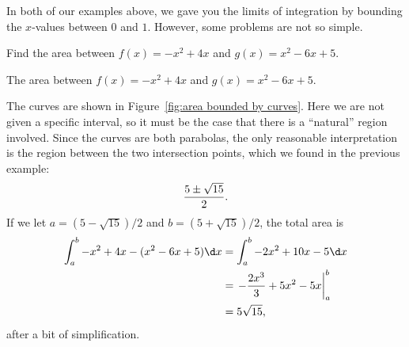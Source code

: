 In both of our examples above, we gave you the limits of integration
by bounding the $x$-values between $0$ and $1$. However, some problems
are not so simple.

\begin{example} Find the area between $f(x)= -x^2+4x$ and
$g(x)=x^2-6x+5$.
\end{example}

\begin{marginfigure}
\caption{The area between $f(x)= -x^2+4x$ and $g(x)=x^2-6x+5$.}
\label{fig:area bounded by curves}
\end{marginfigure}

\begin{solution}
The curves are shown in Figure~\ref{fig:area bounded by curves}. Here
we are not given a specific interval, so it must be the case that
there is a ``natural'' region involved. Since the curves are both
parabolas, the only reasonable interpretation is the region between
the two intersection points, which we found in the previous example:
$${5\pm\sqrt{15}\over2}.$$
If we let $a=(5-\sqrt{15})/2$ and $b=(5+\sqrt{15})/2$,
the total area is 
\begin{align*}
  \int_a^b -x^2+4x-(x^2-6x+5)\d x
  &=\int_a^b -2x^2+10x-5\d x \\
  &=\left.-{2x^3\over3}+5x^2-5x\right|_a^b \\
  &=5\sqrt{15},
\end{align*}
after a bit of simplification.
\end{solution}



